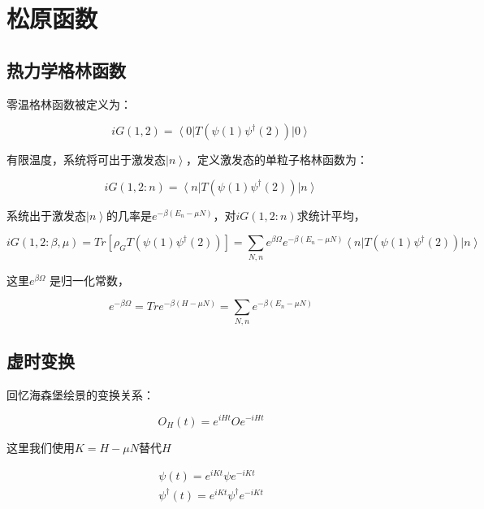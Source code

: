 \section{松原函数}

\subsection{热力学格林函数}

零温格林函数被定义为：

\begin{equation}
i G(1,2) = \left\langle 0 \right| T ( \psi(1) \psi^\dagger (2)) \left| 0 \right\rangle
\end{equation}

有限温度，系统将可出于激发态$\left| n \right\rangle$，定义激发态的单粒子格林函数为：

\begin{equation}
i G (1,2: n) =  \left\langle n \right| T ( \psi(1) \psi^\dagger (2)) \left| n \right\rangle
\end{equation}

系统出于激发态$\left| n \right\rangle$的几率是$e^{- \beta ( E_n - \mu N )}$，对$i G(1,2: n)$求统计平均，

\begin{equation}
i G(1,2: \beta, \mu) = Tr \left[ \rho_G T( \psi(1) \psi^\dagger(2) ) \right] = \sum\limits_{N, n} e^{\beta \Omega} e^{- \beta ( E_n - \mu N )} \left\langle n \right|  T (\psi(1) \psi^\dagger (2)) \left| n \right\rangle   
\end{equation}

这里$e^{\beta \Omega}$ 是归一化常数，

\begin{equation}
e^{-\beta \Omega} = Tr e^{- \beta (H - \mu N)}
= \sum\limits_{N,n} e^{-\beta (E_n - \mu N)}
\end{equation}

\subsection{虚时变换}


回忆海森堡绘景的变换关系：

\begin{equation}
O_H (t) = e^{i H t} O e^{- i H t}
\end{equation}

这里我们使用$K = H - \mu N$替代$H$

\begin{eqnarray*}
\psi (t) = e^{i K t}  \psi e^{-i K t}  \\
\psi^\dagger (t) = e^{i K t } \psi^\dagger e^{- i Kt}
\end{eqnarray*}

